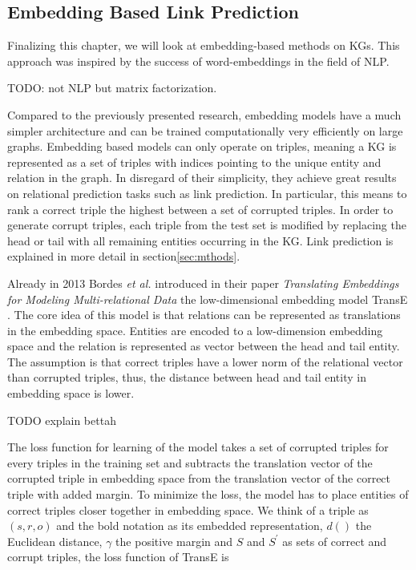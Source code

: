 

\subsection{Embedding Based Link Prediction}
\label{ssec:embedlp}
Finalizing this chapter, we will look at embedding-based methods on KGs. This approach was inspired by the success of word-embeddings in the field of NLP.

TODO: not NLP but matrix factorization.

Compared to the previously presented research, embedding models have a much simpler architecture and can be trained computationally very efficiently on large graphs. Embedding based models can only operate on triples, meaning a KG is represented as a set of triples with indices pointing to the unique entity and relation in the graph. In disregard of their simplicity, they achieve great results on relational prediction tasks such as link prediction. In particular, this means to rank a correct triple the highest between a set of corrupted triples. In order to generate corrupt triples, each triple from the test set is modified by replacing the head or tail with all remaining entities occurring in the KG. Link prediction is explained in more detail in section\ref{sec:mthods}. 


Already in 2013 Bordes \textit{et al.} introduced in their paper \textit{Translating Embeddings for Modeling Multi-relational Data} the low-dimensional embedding model TransE \cite{bordes_translating_2013}. The core idea of this model is that relations can be represented as translations in the embedding space. Entities are encoded to a low-dimension embedding space and the relation is represented as vector between the head and tail entity. The assumption is that correct triples have a lower norm of the relational vector than corrupted triples, thus, the distance between head and tail entity in embedding space is lower. 

TODO explain bettah

The loss function for learning of the model takes a set of corrupted triples for every triples in the training set and subtracts the translation vector of the corrupted triple in embedding space from the translation vector of the correct triple with added margin. To minimize the loss, the model has to place entities of correct triples closer together in embedding space. We think of a triple as $(s,r,o)$ and the bold notation as its embedded representation, $d()$ the Euclidean distance, $\gamma$ the positive margin and $S$ and $S^{\prime}$ as sets of correct and corrupt triples, the loss function of TransE is 

